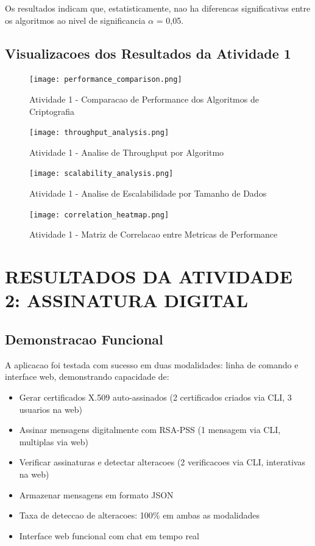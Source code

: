 \documentclass[12pt,a4paper,oneside]{article}
\begin{document}
Os resultados indicam que, estatisticamente, nao ha diferencas significativas entre os algoritmos ao nivel de significancia $\alpha$ = 0,05.

\subsection{Visualizacoes dos Resultados da Atividade 1}

\begin{figure}[H]
\centering
\texttt{[image: performance\_comparison.png]}
\caption{Atividade 1 - Comparacao de Performance dos Algoritmos de Criptografia}
\label{fig:performance1}
\end{figure}

\begin{figure}[H]
\centering
\texttt{[image: throughput\_analysis.png]}
\caption{Atividade 1 - Analise de Throughput por Algoritmo}
\label{fig:throughput1}
\end{figure}

\begin{figure}[H]
\centering
\texttt{[image: scalability\_analysis.png]}
\caption{Atividade 1 - Analise de Escalabilidade por Tamanho de Dados}
\label{fig:scalability1}
\end{figure}

\begin{figure}[H]
\centering
\texttt{[image: correlation\_heatmap.png]}
\caption{Atividade 1 - Matriz de Correlacao entre Metricas de Performance}
\label{fig:correlation1}
\end{figure}

\section{RESULTADOS DA ATIVIDADE 2: ASSINATURA DIGITAL}

\subsection{Demonstracao Funcional}

A aplicacao foi testada com sucesso em duas modalidades: linha de comando e interface web, demonstrando capacidade de:

\begin{itemize}
    \item Gerar certificados X.509 auto-assinados (2 certificados criados via CLI, 3 usuarios na web)
    \item Assinar mensagens digitalmente com RSA-PSS (1 mensagem via CLI, multiplas via web)
    \item Verificar assinaturas e detectar alteracoes (2 verificacoes via CLI, interativas na web)
    \item Armazenar mensagens em formato JSON
    \item Taxa de deteccao de alteracoes: 100\% em ambas as modalidades
    \item Interface web funcional com chat em tempo real
\end{itemize}
\end{document}
